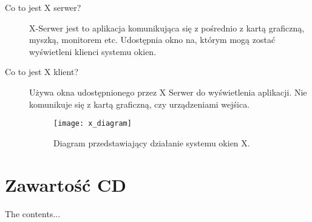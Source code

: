 \begin{appendices}
\begin{description}
	\item[Co to jest X serwer?] \hfill \par
		X-Serwer jest to aplikacja komunikująca się z pośrednio z kartą graficzną, myszką, monitorem etc. Udostępnia okno na, którym mogą zostać wyświetleni klienci systemu okien.
	\item[Co to jest X klient?] \hfill \par
Używa okna udostępnionego przez X Serwer do wyświetlenia aplikacji. Nie komunikuje się z kartą graficzną, czy urządzeniami wejśica.

\begin{figure}[H]
\begin{center}
    \texttt{[image: x\_diagram]}
\end{center}
\caption{Diagram przedstawiający działanie systemu okien X.}
\label{fig:x_diagram}
\end{figure}

		
\end{description}



\section{Zawartość CD}

The contents...



\end{appendices}

